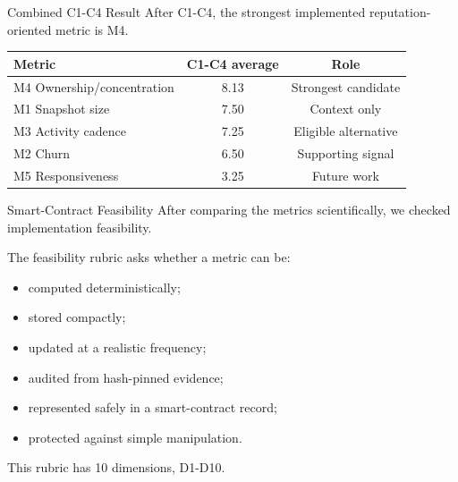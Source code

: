 \documentclass[aspectratio=169,11pt]{beamer}
\begin{document}
\begin{frame}{Combined C1-C4 Result}
  After C1-C4, the strongest implemented reputation-oriented metric is M4.

  \begin{table}
    \footnotesize
    \begin{tabular}{lcc}
      \toprule
      Metric & C1-C4 average & Role \\
      \midrule
      M4 Ownership/concentration & 8.13 & Strongest candidate \\
      M1 Snapshot size & 7.50 & Context only \\
      M3 Activity cadence & 7.25 & Eligible alternative \\
      M2 Churn & 6.50 & Supporting signal \\
      M5 Responsiveness & 3.25 & Future work \\
      \bottomrule
    \end{tabular}
  \end{table}
\end{frame}

\begin{frame}{Smart-Contract Feasibility}
  After comparing the metrics scientifically, we checked implementation feasibility.

  \vspace{0.2cm}
  The feasibility rubric asks whether a metric can be:
  \begin{itemize}
    \item computed deterministically;
    \item stored compactly;
    \item updated at a realistic frequency;
    \item audited from hash-pinned evidence;
    \item represented safely in a smart-contract record;
    \item protected against simple manipulation.
  \end{itemize}

  \vspace{0.2cm}
  This rubric has 10 dimensions, D1-D10.
\end{frame}
\end{document}

